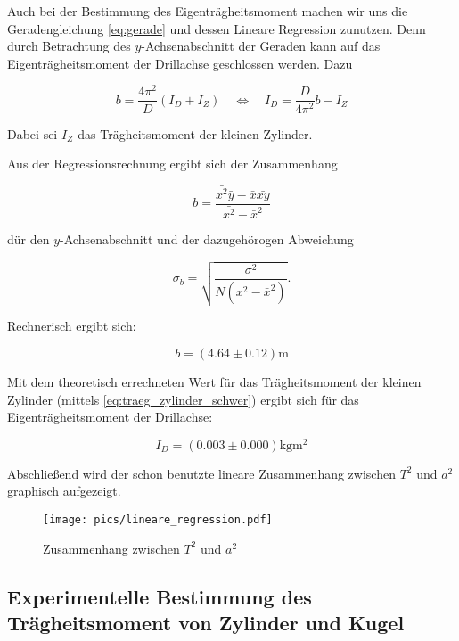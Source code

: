 Auch bei der Bestimmung des Eigenträgheitsmoment machen wir uns die 
Geradengleichung \eqref{eq:gerade} und dessen Lineare Regression zunutzen.
Denn durch Betrachtung des $y$-Achsenabschnitt der Geraden kann auf das Eigenträgheitsmoment der Drillachse geschlossen werden.
Dazu

\begin{equation*}
b=\frac{4\pi^2}{D}\left(I_D+I_Z\right) \quad \Leftrightarrow \quad I_D=\frac{D}{4\pi^2}b-I_Z
\end{equation*}

Dabei sei $I_Z$ das Trägheitsmoment der kleinen Zylinder.

Aus der Regressionsrechnung ergibt sich der Zusammenhang

\begin{equation*}
b=\frac{\bar{x^2}\bar{y}-\bar{x}\bar{xy}}{\bar{x^2}-\bar{x}^2}
\end{equation*}

dür den $y$-Achsenabschnitt und der dazugehörogen Abweichung

\begin{equation*}
\sigma_b=\sqrt{\frac{\sigma^2}{N\left(\bar{x^2}-\bar{x}^2\right)}}.
\end{equation*}

Rechnerisch ergibt sich:

\begin{equation}
\label{eq:y_achsenabschnitt}
b=\left(\num{4.64}\pm\num{0.12}\right) \si{\meter}
\end{equation}

Mit dem theoretisch errechneten Wert für das Trägheitsmoment der kleinen Zylinder (mittels \eqref{eq:traeg_zylinder_schwer}) ergibt sich für das 
Eigenträgheitsmoment der Drillachse:

\begin{equation}
\label{eq:eigentraegheitsmoment}
I_D=\left(\num{0.003}\pm\num{0.000}\right) \si{\kilogram\meter\squared}
\end{equation}


Abschließend wird der schon benutzte lineare Zusammenhang zwischen $T^2$ und $a^2$ graphisch aufgezeigt.

\begin{figure}
  \centering
  \texttt{[image: pics/lineare\_regression.pdf]}
  \caption{Zusammenhang zwischen $T^2$ und $a^2$}
  \label{fig:zusammenhang_a_T}
\end{figure}


\subsection{Experimentelle Bestimmung des Trägheitsmoment von Zylinder und Kugel}

